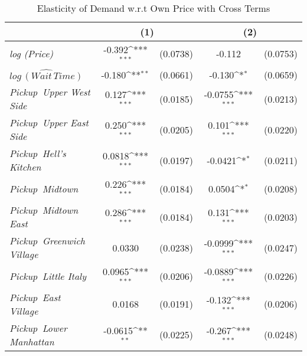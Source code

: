 \begin{table}[h]
\caption{Elasticity of Demand w.r.t Own Price with Cross Terms}\label{tab:lnfare_cross_regression}\\



{
\def\sym#1{\ifmmode^{#1}\else\(^{#1}\)\fi}
\begin{center}
\begin{tabular}{l*{2}{cc}}
\hline\hline
            &\multicolumn{2}{c}{(1)}           &\multicolumn{2}{c}{(2)}           \\ 
\hline
\textit{log (Price)}      &      -0.392\sym{***}&    (0.0738)&      -0.112         &    (0.0753)\\
${\widehat{log\, (Wait\, Time)}}$&      -0.180\sym{**} &    (0.0661)&      -0.130\sym{*}  &    (0.0659)\\
\hspace{3cm}\textit{Pickup\, Upper West Side}&       0.127\sym{***}&    (0.0185)&     -0.0755\sym{***}&    (0.0213)\\
\hspace{3cm}\textit{Pickup\, Upper East Side}&       0.250\sym{***}&    (0.0205)&       0.101\sym{***}&    (0.0220)\\
\hspace{3cm}\textit{Pickup\, Hell's Kitchen}&      0.0818\sym{***}&    (0.0197)&     -0.0421\sym{*}  &    (0.0211)\\
\hspace{3cm}\textit{Pickup\, Midtown}&       0.226\sym{***}&    (0.0184)&      0.0504\sym{*}  &    (0.0208)\\
\hspace{3cm}\textit{Pickup\, Midtown East}&       0.286\sym{***}&    (0.0184)&       0.131\sym{***}&    (0.0203)\\
\hspace{3cm}\textit{Pickup\, Greenwich Village}&      0.0330         &    (0.0238)&     -0.0999\sym{***}&    (0.0247)\\
\hspace{3cm}\textit{Pickup\, Little Italy}&      0.0965\sym{***}&    (0.0206)&     -0.0889\sym{***}&    (0.0226)\\
\hspace{3cm}\textit{Pickup\, East Village}&      0.0168         &    (0.0191)&      -0.132\sym{***}&    (0.0206)\\
\hspace{3cm}\textit{Pickup\, Lower Manhattan}&     -0.0615\sym{**} &    (0.0225)&      -0.267\sym{***}&    (0.0248)\\

\end{tabular}
\end{center}}
\end{table}
